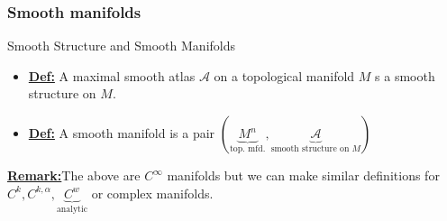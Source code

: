 \documentclass{article}
\begin{document}
\subsubsection{Smooth manifolds}
\vskip 1cm
\begin{mathdefinitionbox}{Smooth Structure and Smooth Manifolds}
  \begin{itemize}
    \item \underline{\textbf{Def:}} A maximal smooth atlas $\mathcal{A}$ on a topological manifold $M$ s a smooth structure on $M$.
    \item \underline{\textbf{Def:}} A smooth manifold is a pair $(\underbrace{M^n}_{\text{top. mfd.}}, \underbrace{\mathcal{A}}_{\text{smooth structure on $M$}})$ 
  \end{itemize}

  \underline{\textbf{Remark:}}The above are $C^{\infty}$ manifolds but we can make similar definitions for $C^{k}, C^{k, \alpha}, \underbrace{C^{w}}_{\text{analytic}}$ or complex manifolds.
\end{mathdefinitionbox}
\end{document}

